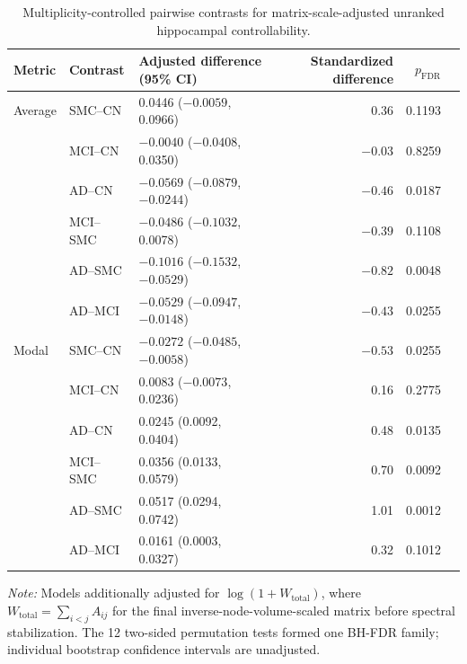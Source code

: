 \documentclass{article}
\begin{document}
\begin{table}[!htbp]
\centering
\caption{Multiplicity-controlled pairwise contrasts for matrix-scale-adjusted unranked hippocampal controllability.}
\label{tab:raw_pairwise}
\scriptsize
\begin{tabular}{lllrrr}
\toprule
Metric & Contrast & Adjusted difference (95\% CI) & Standardized difference & $p_{\mathrm{FDR}}$\\
\midrule
Average & SMC--CN & 0.0446 ($-0.0059$, 0.0966) & 0.36 & 0.1193\\
& MCI--CN & $-0.0040$ ($-0.0408$, 0.0350) & $-0.03$ & 0.8259\\
& AD--CN & $-0.0569$ ($-0.0879$, $-0.0244$) & $-0.46$ & 0.0187\\
& MCI--SMC & $-0.0486$ ($-0.1032$, 0.0078) & $-0.39$ & 0.1108\\
& AD--SMC & $-0.1016$ ($-0.1532$, $-0.0529$) & $-0.82$ & 0.0048\\
& AD--MCI & $-0.0529$ ($-0.0947$, $-0.0148$) & $-0.43$ & 0.0255\\
\addlinespace
Modal & SMC--CN & $-0.0272$ ($-0.0485$, $-0.0058$) & $-0.53$ & 0.0255\\
& MCI--CN & 0.0083 ($-0.0073$, 0.0236) & 0.16 & 0.2775\\
& AD--CN & 0.0245 (0.0092, 0.0404) & 0.48 & 0.0135\\
& MCI--SMC & 0.0356 (0.0133, 0.0579) & 0.70 & 0.0092\\
& AD--SMC & 0.0517 (0.0294, 0.0742) & 1.01 & 0.0012\\
& AD--MCI & 0.0161 (0.0003, 0.0327) & 0.32 & 0.1012\\
\bottomrule
\end{tabular}
\par\vspace{1mm}
\footnotesize{\textit{Note:} Models additionally adjusted for $\log(1+W_{\mathrm{total}})$, where $W_{\mathrm{total}}=\sum_{i<j}A_{ij}$ for the final inverse-node-volume-scaled matrix before spectral stabilization. The 12 two-sided permutation tests formed one BH-FDR family; individual bootstrap confidence intervals are unadjusted.}
\end{table}
\end{document}
